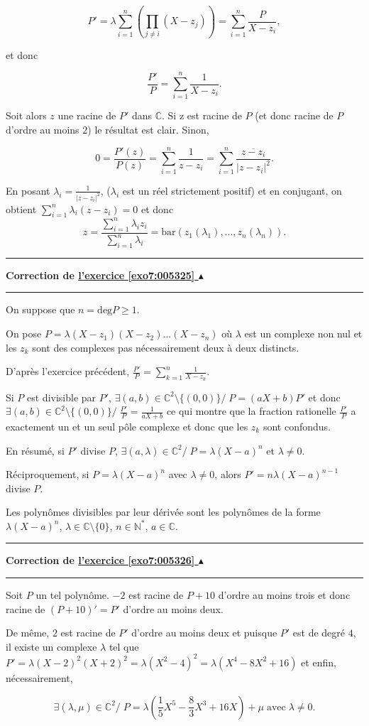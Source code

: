 \documentclass[11pt,a4paper]{article}
\newcommand{\Nn}{\mathbb{N}} \newcommand{\N}{\mathbb{N}}
\newcommand{\Cc}{\mathbb{C}} \newcommand{\C}{\mathbb{C}}
\newcounter{exo}
\newcommand{\correction}[1]{\hypertarget{cor7:#1}{}\label{cor7:#1}{\bf Correction de \hyperlink{exo7:#1}{l'exercice \ref{exo7:#1} $\blacktriangle$}}\vspace{1mm}\hrule\vspace{1mm}}
\newcommand{\fincorrection}{\vspace{1mm}\hrule\vspace*{7mm}}
\begin{document}
$$P'=\lambda\sum_{i=1}^{n}(\prod_{j\neq i}^{}(X-z_j))=\sum_{i=1}^{n}\frac{P}{X-z_i},$$

et donc 
 
$$\frac{P'}{P}=\sum_{i=1}^{n}\frac{1}{X-z_i}.$$

Soit alors $z$ une racine de $P'$ dans $\Cc$. Si z est racine de $P$ (et donc racine de $P$ d'ordre au moins $2$) le résultat est clair. Sinon,

$$0=\frac{P'(z)}{P(z)}=\sum_{i=1}^{n}\frac{1}{z-z_i}=\sum_{i=1}^{n}\frac{\overline{z-z_i}}{|z-z_i|^2}.$$

En posant $\lambda_i=\frac{1}{|z-z_i|^2}$, ($\lambda_i$ est un réel strictement positif) et en conjugant, on obtient
$\sum_{i=1}^{n}\lambda_i(z-z_i)=0$ et donc 
$$z=\frac{\sum_{i=1}^{n}\lambda_iz_i}{\sum_{i=1}^{n}\lambda_i}=\mbox{bar}(z_1(\lambda_1),...,z_n(\lambda_n)).$$
\fincorrection
\correction{005325}
On suppose que $n=\mbox{deg}P\geq1$.

On pose $P=\lambda(X-z_1)(X-z_2)...(X-z_n)$ où $\lambda$ est un complexe non nul et les $z_k$ sont des complexes pas nécessairement deux à deux distincts.

D'après l'exercice précédent, $\frac{P'}{P}=\sum_{k=1}^{n}\frac{1}{X-z_k}$.

Si $P$ est divisible par $P'$, $\exists(a,b)\in\Cc^2\setminus\{(0,0)\}/\;P=(aX+b)P'$ et donc $\exists(a,b)\in\Cc^2\setminus\{(0,0)\}/\;\frac{P'}{P}=\frac{1}{aX+b}$ ce qui montre que la fraction rationelle $\frac{P'}{P}$ a exactement un et un seul pôle complexe et donc que les $z_k$ sont confondus.

En résumé, si $P'$ divise $P$, $\exists(a,\lambda)\in\Cc^2/\;P=\lambda(X-a)^n$ et $\lambda\neq0$.

Réciproquement, si $P=\lambda(X-a)^n$ avec $\lambda\neq0$, alors $P'=n\lambda(X-a)^{n-1}$ divise $P$.

Les polynômes divisibles par leur dérivée sont les polynômes de la forme $\lambda(X-a)^n$, $\lambda\in\Cc\setminus\{0\}$, $n\in\Nn^*$, $a\in\Cc$.
\fincorrection
\correction{005326}
Soit $P$ un tel polynôme. $-2$ est racine de $P+10$ d'ordre au moins trois et donc racine de $(P+10)'= P'$ d'ordre au moins deux.

De même, $2$ est racine de $P'$ d'ordre au moins deux et puisque $P'$ est de degré $4$, il existe un complexe $\lambda$ tel que $P'=\lambda(X-2)^2(X+2)^2=\lambda(X^2-4)^2=\lambda(X^4-8X^2+16)$ et enfin, nécessairement,

$$\exists(\lambda,\mu)\in\Cc^2/\;P=\lambda(\frac{1}{5}X^5-\frac{8}{3}X^3+16X)+\mu\;\mbox{avec}\;\lambda\neq0.$$
\end{document}
